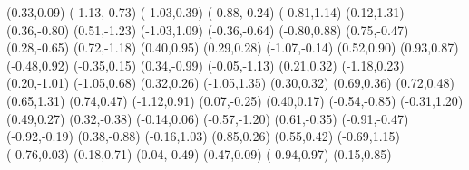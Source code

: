 \psdot[](0.33,0.09)
\psdot[](-1.13,-0.73)
\psdot[](-1.03,0.39)
\psdot[](-0.88,-0.24)
\psdot[](-0.81,1.14)
\psdot[](0.12,1.31)
\psdot[](0.36,-0.80)
\psdot[](0.51,-1.23)
\psdot[](-1.03,1.09)
\psdot[](-0.36,-0.64)
\psdot[](-0.80,0.88)
\psdot[](0.75,-0.47)
\psdot[](0.28,-0.65)
\psdot[](0.72,-1.18)
\psdot[](0.40,0.95)
\psdot[](0.29,0.28)
\psdot[](-1.07,-0.14)
\psdot[](0.52,0.90)
\psdot[](0.93,0.87)
\psdot[](-0.48,0.92)
\psdot[](-0.35,0.15)
\psdot[](0.34,-0.99)
\psdot[](-0.05,-1.13)
\psdot[](0.21,0.32)
\psdot[](-1.18,0.23)
\psdot[](0.20,-1.01)
\psdot[](-1.05,0.68)
\psdot[](0.32,0.26)
\psdot[](-1.05,1.35)
\psdot[](0.30,0.32)
\psdot[](0.69,0.36)
\psdot[](0.72,0.48)
\psdot[](0.65,1.31)
\psdot[](0.74,0.47)
\psdot[](-1.12,0.91)
\psdot[](0.07,-0.25)
\psdot[](0.40,0.17)
\psdot[](-0.54,-0.85)
\psdot[](-0.31,1.20)
\psdot[](0.49,0.27)
\psdot[](0.32,-0.38)
\psdot[](-0.14,0.06)
\psdot[](-0.57,-1.20)
\psdot[](0.61,-0.35)
\psdot[](-0.91,-0.47)
\psdot[](-0.92,-0.19)
\psdot[](0.38,-0.88)
\psdot[](-0.16,1.03)
\psdot[](0.85,0.26)
\psdot[](0.55,0.42)
\psdot[](-0.69,1.15)
\psdot[](-0.76,0.03)
\psdot[](0.18,0.71)
\psdot[](0.04,-0.49)
\psdot[](0.47,0.09)
\psdot[](-0.94,0.97)
\psdot[](0.15,0.85)
